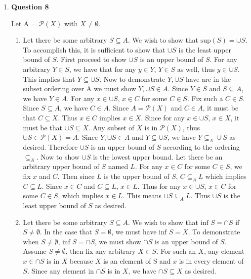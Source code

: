 \documentclass{article}
\begin{document}
\begin{enumerate}
\item \textbf{Question 8}
\medskip

Let A = $\mathcal{P}(X)$ with $X \neq \emptyset$.

\begin{enumerate}
	\item Let there be some arbitrary $S \subseteq A$. We wish to show that $\text{sup}(S) = \cup S$. To accomplish this, it is sufficient to show that $\cup S$ is the least upper bound of $S$. First proceed to show $\cup S$ is an upper bound of $S$. For any arbitrary $Y \in S$, we have that for any $y \in Y$, $Y \in S$ as well, thus $y \in \cup S$. This implies that $Y \subseteq \cup S$. Now to demonstrate $Y, \cup S$ have are in the subset ordering over A we must show $Y, \cup S \in A$. Since $Y \in S$ and $S \subseteq A$, we have $Y \in A$. For any $x \in \cup S$, $x \in C$ for some $C \in S$. Fix such a $C \in S$. Since $S \subseteq A$, we have $C \in A$. Since $A = \mathcal{P}(X)$ and $C \in A$, it must be that $C \subseteq X$. Thus $x \in C$ implies $x \in X$. Since for any $x \in \cup S$, $x \in X$, it must be that $\cup S \subseteq X$. Any subset of $X$ is in $\mathcal{P}(X)$, thus $\cup S \in \mathcal{P}(X) = A$. Since $Y, \cup S \in A$ and $Y \subseteq \cup S$, we have $Y \subseteq_{A} \cup S$ as desired. Therefore $\cup S$ is an upper bound of $S$ according to the ordering $\subseteq_{A}$. Now to show $\cup S$ is the lowest upper bound. Let there be an arbitrary upper bound of $S$ named $L$. For any $x \in C$ for some $C \in S$, we fix $x$ and $C$. Then since $L$ is the upper bound of $S$, $C \subseteq_{A} L$ which implies $C \subseteq L$. Since $x \in C$ and $C \subseteq L$, $x \in L$. Thus for any $x \in \cup S$, $x \in C$ for some $C \in S$, which implies $x \in L$. This means $\cup S \subseteq_{A} L$. Thus $\cup S$ is the least upper bound of $S$ as desired.
	
	\item Let there be some arbitrary $S \subseteq A$. We wish to show that $\text{inf } S = \cap S$ if $S \neq \emptyset$. In the case that $S = \emptyset$, we must have $\text{inf }S = X$. To demonstrate when $S \neq \emptyset$, $\text{inf } S = \cap S$, we must show $\cap S$ is an upper bound of $S$. Assume $S \neq \emptyset$, then fix any arbitrary $X \in S$. For such an $X$, any element $x \in \cap S$ is in $X$ because $X$ is an element of S and $x$ is in every element of $S$. Since any element in $\cap S$ is in $X$, we have $\cap S \subseteq X$ as desired. 
	
	\medskip
	

\end{enumerate}
\end{enumerate}
\end{document}
